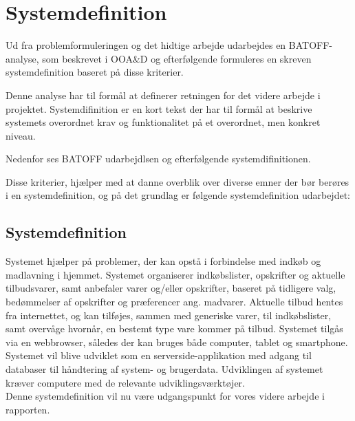 \section{Systemdefinition}
Ud fra problemformuleringen og det hidtige arbejde udarbejdes en BATOFF-analyse, som beskrevet i OOA\&D\citep{OOA&D2001} og efterfølgende formuleres en skreven systemdefinition baseret på disse kriterier.

Denne analyse har til formål at definerer retningen for det videre arbejde i projektet.
Systemdifinition er en kort tekst der har til formål at beskrive systemets overordnet krav og funktionalitet på et overordnet, men konkret niveau.

Nedenfor ses BATOFF udarbejdlsen og efterfølgende systemdifinitionen.



Disse kriterier, hjælper med at danne overblik over diverse emner der bør berøres i en systemdefinition, og på det grundlag er følgende systemdefinition udarbejdet:

\subsection{Systemdefinition}

Systemet hjælper på problemer, der kan opstå i forbindelse med indkøb og madlavning i hjemmet.
Systemet organiserer indkøbslister, opskrifter og aktuelle tilbudsvarer, samt anbefaler varer og/eller opskrifter, baseret på tidligere valg, bedømmelser af opskrifter og præferencer ang. madvarer.
Aktuelle tilbud hentes fra internettet, og kan tilføjes, sammen med generiske varer, til indkøbslister, samt overvåge hvornår, en bestemt type vare kommer på tilbud.
Systemet tilgås via en webbrowser, således der kan bruges både computer, tablet og smartphone.
Systemet vil blive udviklet som en serverside-applikation med adgang til databaser til håndtering af system- og brugerdata.
Udviklingen af systemet kræver computere med de relevante udviklingsværktøjer.\\

Denne systemdefinition vil nu være udgangspunkt for vores videre arbejde i rapporten.
